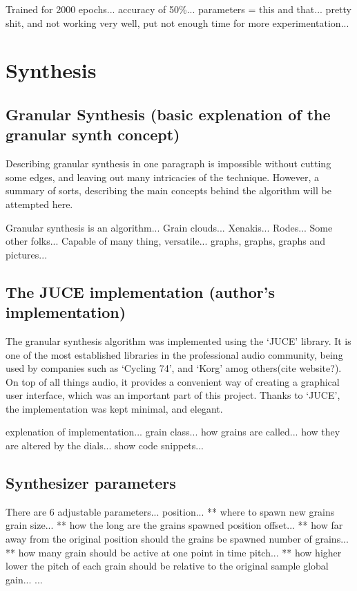 Trained for 2000 epochs...
accuracy of 50\%...
parameters = this and that...
pretty shit, and not working very well, put not enough time for more experimentation...

\section{Synthesis}

\subsection{Granular Synthesis (basic explenation of the granular synth concept)}

Describing granular synthesis in one paragraph is impossible
without cutting some edges, and leaving out many intricacies of the
technique. However, a summary of sorts, describing the main concepts
behind the algorithm will be attempted here. 

Granular synthesis is an algorithm...
Grain clouds...
Xenakis...
Rodes...
Some other folks...
Capable of many thing, versatile...
graphs, graphs, graphs and pictures...

\subsection{The JUCE implementation (author's implementation)}

The granular synthesis algorithm was implemented using the `JUCE'
library. It is one of the most established libraries in the
professional audio community, being used by companies such as `Cycling
74', and `Korg' amog others(cite website?). On top of all things
audio, it provides a convenient way of creating a graphical user
interface, which was an important part of this project. Thanks to
`JUCE', the implementation was kept minimal, and elegant.

explenation of implementation...
grain class...
how grains are called...
how they are altered by the dials...
show code snippets...

\subsection{Synthesizer parameters}

There are 6 adjustable parameters...
position...
** where to spawn new grains
grain size...
** how the long are the grains spawned
position offset...
** how far away from the original position should the grains be spawned
number of grains...
** how many grain should be active at one point in time
pitch...
** how higher lower the pitch of each grain should be relative to the
original sample
global gain...
...





